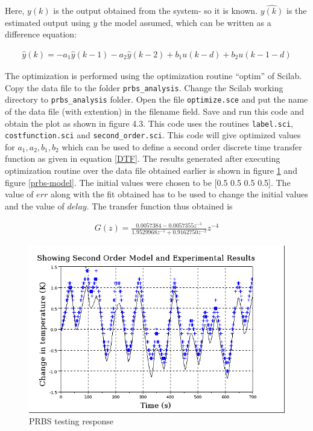 Here, $y(k)$ is the output obtained from the system- so it is known. $\hat{y(k)}$ is the estimated output using $y$ the model 
assumed, which can be written as a difference equation:

\begin{align}
\hat{y}(k) = -a_1\hat{y}(k - 1) - a_2\hat{y}(k - 2) + b_1 u(k - d) + b_2 u(k - 1 - d)
\end{align}

The optimization is performed using the optimization routine “optim” of Scilab. Copy the  data file to the folder 
{\tt prbs\_analysis}. Change the Scilab working directory to {\tt prbs\_analysis} folder. Open the file {\tt optimize.sce} 
and put the name of the data file (with extention) in the filename field. Save and run this code and obtain the plot as 
shown in figure 4.3. This code uses the routines {\tt label.sci}, {\tt costfunction.sci} and {\tt second\_order.sci}. This 
code will give optimized values for $a_1, a_2, b_1, b_2$ which can be used to define a second order discrete time transfer 
function as given in equation \ref{DTF}. The results generated after executing optimization routine over the data file 
obtained earlier is shown in figure \ref{prbs-fit} and figure \ref{prbs-model}. The initial values were chosen to be 
[0.5 0.5 0.5 0.5]. The value of $err$ along with the fit obtained has to be used to change the initial values and the value 
of $delay$. The transfer function thus obtained is 

\begin{align}\label{model}
G(z)=\frac{0.0057384 - 0.0057355 z^{-1}}{1.9529968z^{-1}+0.9162750z^{-2}}z^{-4}
\end{align}



\begin{figure}
\centering
\includegraphics[width=0.7\linewidth]{prbs/prbs-fit.png}
\caption{PRBS testing response}
\label{prbs-fit}
\end{figure}


